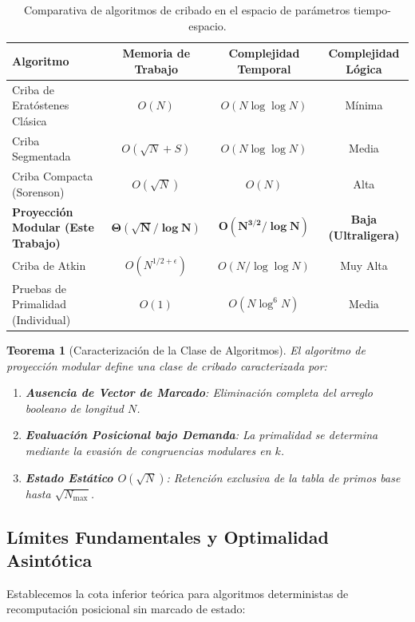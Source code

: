 \documentclass{article}
\numberwithin{equation}{section}
\theoremstyle{plain}
\newtheorem{theorem}{Teorema}[section]
\theoremstyle{definition}
\begin{document}
\begin{table}[htbp]
\centering
\small
\setlength{\tabcolsep}{3.5pt}
\caption{Comparativa de algoritmos de cribado en el espacio de parámetros tiempo-espacio.}
\label{tab:espectro-algoritmos}
\begin{tabular}{lccc}
\toprule
\textbf{Algoritmo} & \textbf{Memoria de Trabajo} & \textbf{Complejidad Temporal} & \textbf{Complejidad Lógica} \\
\midrule
Criba de Eratóstenes Clásica & $O(N)$ & $O(N \log \log N)$ & Mínima \\
Criba Segmentada & $O(\sqrt{N} + S)$ & $O(N \log \log N)$ & Media \\
Criba Compacta (Sorenson) & $O(\sqrt{N})$ & $O(N)$ & Alta \\
\textbf{Proyección Modular (Este Trabajo)} & $\mathbf{\Theta(\sqrt{N}/\log N)}$ & $\mathbf{O(N^{3/2}/\log N)}$ & \textbf{Baja (Ultraligera)} \\
Criba de Atkin & $O(N^{1/2+\epsilon})$ & $O(N/\log \log N)$ & Muy Alta \\
Pruebas de Primalidad (Individual) & $O(1)$ & $O(N \log^6 N)$ & Media \\
\bottomrule
\end{tabular}
\end{table}

\begin{theorem}[Caracterización de la Clase de Algoritmos]
\label{thm:clase-algoritmos}
El algoritmo de proyección modular define una clase de cribado caracterizada por:
\begin{enumerate}
    \item \textbf{Ausencia de Vector de Marcado}: Eliminación completa del arreglo booleano de longitud $N$.
    \item \textbf{Evaluación Posicional bajo Demanda}: La primalidad se determina mediante la evasión de congruencias modulares en $k$.
    \item \textbf{Estado Estático $O(\sqrt{N})$}: Retención exclusiva de la tabla de primos base hasta $\sqrt{N_{\max}}$.
\end{enumerate}
\end{theorem}

\subsection{Límites Fundamentales y Optimalidad Asintótica}

Establecemos la cota inferior teórica para algoritmos deterministas de recomputación posicional sin marcado de estado:
\end{document}
